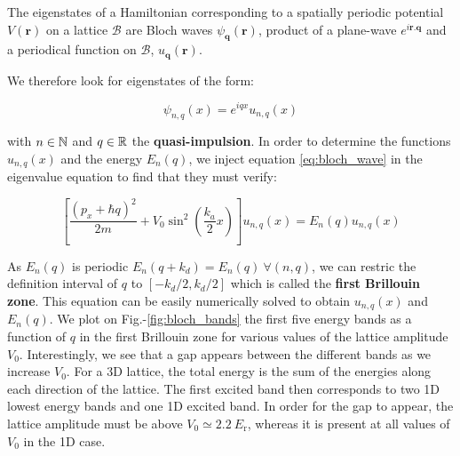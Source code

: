 \begin{tcolorbox}[colback=red!5!white,colframe=red!75!black,title=\textbf{Bloch's theorem}]
\label{sec:bloch}
The eigenstates of a Hamiltonian corresponding to a spatially periodic potential $V(\bm{r})$ on a lattice $\mathcal{B}$ are Bloch waves $\psi_{\bm{q}}(\bm{r})$, product of a plane-wave $e^{i \bm{r}.\bm{q}}$ and a periodical function on $\mathcal{B}$, $u_{\bm{q}} (\bm{r})$.
\end{tcolorbox}

We therefore look for eigenstates of the form:

\begin{equation}
    \psi_{n,q} (x)= e^{iqx} u_{n,q} (x)
    \label{eq:bloch_wave}
\end{equation}

\noindent with $n \in \mathbb{N}$ and $q \in \mathbb{R}$ the \textbf{quasi-impulsion}. In order to determine the functions $u_{n,q} (x)$ and the energy $E_n (q)$, we inject equation \ref{eq:bloch_wave} in the eigenvalue equation to find that they must verify:

\begin{equation}
    \left[\frac{\left(p_{x}+\hbar q\right)^{2}}{2 m}+V_{0} \sin ^{2}\left(\frac{k_{a}}{2} x\right)\right] u_{n, q}(x)=E_{n}(q) u_{n, q}(x)
\end{equation}

\noindent As $E_n (q)$ is periodic $E_n (q+k_d)= E_n(q) \ \forall (n,q)$, we can restric the definition interval of $q$ to $[-k_d/2, k_d/2]$ which is called the \textbf{first Brillouin zone}. This equation can be easily numerically solved to obtain $u_{n, q}(x)$ and $E_n (q)$. We plot on Fig.-\ref{fig:bloch_bands} the first five energy bands as a function of $q$ in the first Brillouin zone for various values of the lattice amplitude $V_0$. Interestingly, we see that a gap appears between the different bands as we increase $V_0$. For a 3D lattice, the total energy is the sum of the energies along each direction of the lattice. The first excited band then corresponds to two 1D lowest energy bands and one 1D excited band. In order for the gap to appear, the lattice amplitude must be above $V_0 \simeq 2.2 \ E_{\mathrm{r}}$, whereas it is present at all values of $V_0$ in the 1D case.

